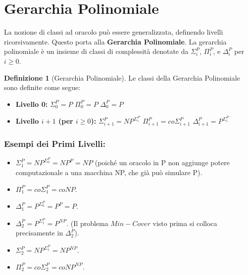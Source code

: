 \documentclass[a4paper]{article}
\theoremstyle{definition} %
\newtheorem{definition}{Definizione}
\begin{document}
\section{Gerarchia Polinomiale}
La nozione di classi ad oracolo può essere generalizzata, definendo livelli ricorsivamente. Questo porta alla \textbf{Gerarchia Polinomiale}.
La gerarchia polinomiale è un insieme di classi di complessità denotate da $\Sigma_i^P$, $\Pi_i^P$, e $\Delta_i^P$ per $i \ge 0$.

\begin{definition}[Gerarchia Polinomiale]
Le classi della Gerarchia Polinomiale sono definite come segue:
\begin{itemize}
    \item \textbf{Livello 0:}
    $\Sigma_0^P = P$
    $\Pi_0^P = P$
    $\Delta_0^P = P$
    \item \textbf{Livello $i+1$ (per $i \ge 0$):}
    $\Sigma_{i+1}^P = NP^{\Sigma_i^P}$
    $\Pi_{i+1}^P = co\Sigma_{i+1}^P$
    $\Delta_{i+1}^P = P^{\Sigma_i^P}$
\end{itemize}
\end{definition}

\subsubsection{Esempi dei Primi Livelli:}
\begin{itemize}
    \item $\Sigma_1^P = NP^{\Sigma_0^P} = NP^P = NP$ (poiché un oracolo in P non aggiunge potere computazionale a una macchina NP, che già può simulare P).
    \item $\Pi_1^P = co\Sigma_1^P = coNP$.
    \item $\Delta_1^P = P^{\Sigma_0^P} = P^P = P$.
    \item $\Delta_2^P = P^{\Sigma_1^P} = P^{NP}$. (Il problema $Min-Cover$ visto prima si colloca precisamente in $\Delta_2^P$).
    \item $\Sigma_2^P = NP^{\Sigma_1^P} = NP^{NP}$.
    \item $\Pi_2^P = co\Sigma_2^P = coNP^{NP}$.
\end{itemize}
\end{document}
